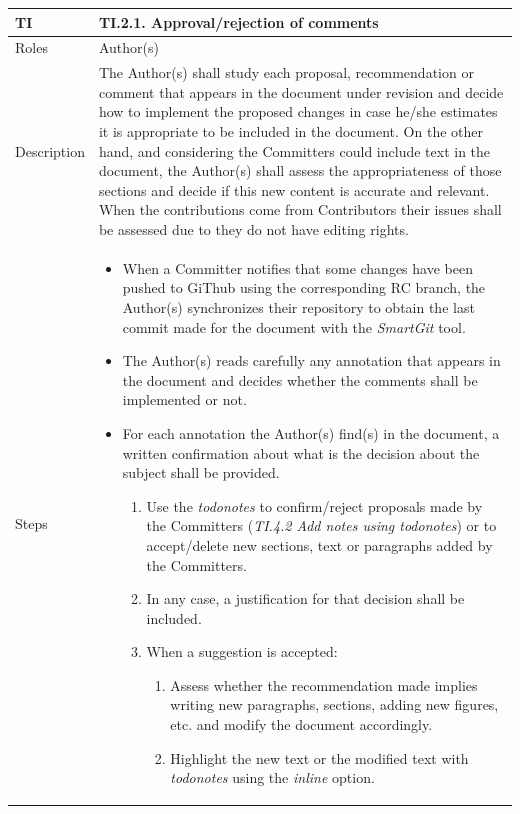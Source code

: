 \documentclass{template/openetcs_article}
\begin{document}
\begin{flushleft}
\tablefirsthead{}
\tablehead{}
\tabletail{}
\tablelasttail{}
\begin{supertabular}{|m{2cm}|m{13cm}|}
\hline
{}
TI & 
TI.2.1. Approval/rejection of comments
\\\hline
Roles &
Author(s)
\\\hline
Description &
The Author(s) shall study each proposal, recommendation or comment that appears in the document under revision and decide how to implement the proposed changes in case he/she estimates it is appropriate to be included in the document. On the other hand, and considering the Committers could include text in the document, the Author(s) shall assess the appropriateness of those sections and decide if this new content is accurate and relevant. When the contributions come from Contributors their issues shall be assessed due to they do not have editing rights.
\\\hline
Steps &
\begin{itemize}
\item When a Committer notifies that some changes have been pushed to GiThub using the corresponding RC branch, the Author(s) synchronizes their repository to obtain the last commit made for the document with the {\it SmartGit} tool.
\item The Author(s) reads carefully any annotation that appears in the document and decides whether the comments shall be implemented or not.
\item For each annotation the Author(s) find(s) in the document, a written confirmation about what is the decision about the subject shall be provided. 
\begin{enumerate}
\item Use the {\it todonotes} to confirm/reject proposals made by the Committers ({\it TI.4.2 Add notes using todonotes}) or to accept/delete new sections, text or paragraphs added by the Committers.
\item In any case, a justification for that decision shall be included.
\item When a suggestion is accepted:
\begin{enumerate}
\item Assess whether the recommendation made implies writing new paragraphs, sections, adding new figures, etc. and modify the document accordingly. 
\item Highlight the new text or the modified text with {\it todonotes} using the {\it inline} option.
\end{enumerate}

\end{enumerate}
\end{itemize}
\end{supertabular}
\end{flushleft}
\end{document}
